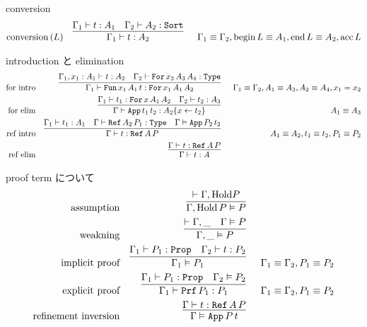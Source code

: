 \begin{itembox}[l]{conversion}
\begin{align*}
  \text{conversion} \, (L) &&
  \infer[]{
    \Gamma_1 \vdash t : A_2}{\Gamma_1 \vdash t : A_1 & \Gamma_2 \vdash A_2 : \texttt{Sort}
  } && \Gamma_1 \equiv \Gamma_2 , \text{begin} \, L \equiv A_1 , \text{end} \, L \equiv A_2 , \text{acc} \, L
\end{align*}
\end{itembox}

\begin{itembox}[l]{introduction と elimination}
\begin{align*}
  \text{for intro} &&
  \infer[]{
    \Gamma_1 \vdash \texttt{Fun} \, x_1 \, A_1 \, t : \texttt{For} \, x_1 \, A_1 \, A_2}{\Gamma_1 , x_1 : A_1 \vdash t : A_2 & \Gamma_2 \vdash \texttt{For} \, x_2 \, A_3 \, A_4 : \texttt{Type}
  } && \Gamma_1 \equiv \Gamma_2 , A_1 \equiv A_3 , A_2 \equiv A_4 , x_1 = x_2 \\
  \text{for elim} &&
  \infer[]{
    \Gamma \vdash \texttt{App} \, t_1 \, t_2 : A_2\{x \leftarrow t_2\}}{\Gamma_1 \vdash t_1 : \texttt{For} \, x \, A_1 \, A_2 & \Gamma_2 \vdash t_2 : A_3
  } && A_1 \equiv A_3 \\
  \text{ref intro} &&
  \infer[]{
    \Gamma \vdash t : \texttt{Ref} \, A \, P}{\Gamma_1 \vdash t_1 : A_1 & \Gamma \vdash \texttt{Ref} \, A_2 \, P_1 : \texttt{Type} & \Gamma \vDash \texttt{App} \, P_2 \, t_2
  } && A_1 \equiv A_2 , t_1 \equiv t_2 , P_1 \equiv P_2 \\
  \text{ref elim} &&
  \infer[]{
    \Gamma \vdash t : A}{\Gamma \vdash t : \texttt{Ref} \, A \, P}
\end{align*}
\end{itembox}

\begin{itembox}[l]{proof term について}
\begin{align*}
  \text{assumption} &&
  \infer[]{\Gamma , \text{Hold} \, P \vDash P}{\vdash \Gamma , \text{Hold} P} \\
  \text{weakning} &&
  \infer[]{\Gamma , \_ \vDash P}{ \vdash \Gamma , \_ & \Gamma \vDash P} \\
  \text{implicit proof} &&
  \infer[]{
    \Gamma_1 \vDash P_1}{\Gamma_1 \vdash P_1 : \texttt{Prop} & \Gamma _2 \vdash t : P_2
  } && \Gamma_1 \equiv \Gamma_2 , P_1 \equiv P_2 \\
  \text{explicit proof} &&
  \infer[]{
    \Gamma_1 \vdash \texttt{Prf} \, P_1 : P_1}{\Gamma_1 \vdash P_1 : \texttt{Prop} &\Gamma_2 \vDash P_2
  } && \Gamma_1 \equiv \Gamma_2 , P_1 \equiv P_2 \\
  \text{refinement inversion} && 
  \infer[]{\Gamma \vDash \texttt{App} \, P \, t}{\Gamma \vdash t : \texttt{Ref} \, A \, P}
\end{align*}
\end{itembox}